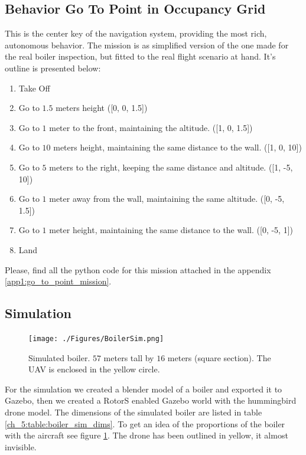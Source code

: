   \subsection{Behavior Go To Point in Occupancy Grid} \label{ch_5:subsect:behav_gtp_mission}

    This is the center key of the navigation system, providing the most rich, autonomous behavior. The mission is as simplified version of the one made for the real boiler inspection, but fitted to the real flight scenario at hand. It's outline is presented below:

    \begin{enumerate}
      \item Take Off
      \item Go to $1.5$ meters height ([0, 0, 1.5])
      \item Go to $1$ meter to the front, maintaining the altitude. ([1, 0, 1.5])
      \item Go to $10$ meters height, maintaining the same distance to the wall. ([1, 0, 10])
      \item Go to $5$ meters to the right, keeping the same distance and altitude. ([1, -5, 10])
      \item Go to $1$ meter away from the wall, maintaining the same altitude. ([0, -5, 1.5])
      \item Go to $1$ meter height, maintaining the same distance to the wall. ([0, -5, 1])
      \item Land
    \end{enumerate}

    Please, find all the python code for this mission attached in the appendix \ref{app1:go_to_point_mission}.

  \subsection{Simulation} \label{ch_5:subsect:exp_simulation}

    \begin{figure}[!h]
      \centering
      \texttt{[image: ./Figures/BoilerSim.png]}
      \caption{Simulated boiler. $57$ meters tall by $16$ meters (square section). The UAV is enclosed in the yellow circle.}
      \label{ch_5:fig:boiler_sim}
    \end{figure}

    For the simulation we created a blender model of a boiler and exported it to Gazebo, then we created a RotorS enabled Gazebo world with the hummingbird drone model. The dimensions of the simulated boiler are listed in table \ref{ch_5:table:boiler_sim_dims}. To get an idea of the proportions of the boiler with the aircraft see figure \ref{ch_5:fig:boiler_sim}. The drone has been outlined in yellow, it almost invisible.

